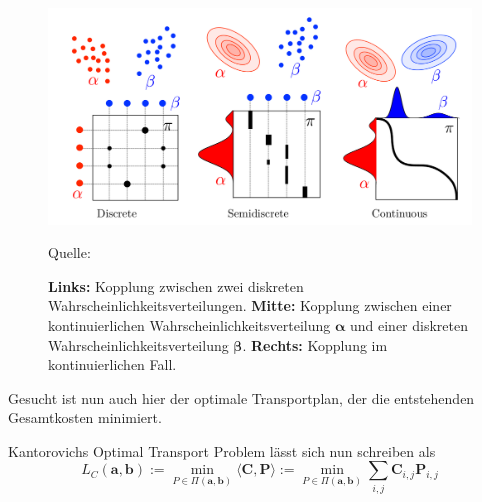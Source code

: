 \documentclass[twoside, 12pt,a4paper]{book}
\newcommand{\source}[1]{\caption*{\hfill Quelle: {#1}} }
\numberwithin{equation}{section}
\begin{document}
	\begin{figure}[ht]
		\centering
		\includegraphics[width=0.4\textheight]{coupling_disc_semid_cont.png}
		\caption[Transportpläne im diskreten, semi-diskreten und kontinuierlichen Fall]{\textbf{Links: }Kopplung zwischen zwei diskreten Wahrscheinlichkeitsverteilungen. \textbf{ Mitte: }Kopplung zwischen einer kontinuierlichen Wahrscheinlichkeitsverteilung $\boldsymbol{\alpha}$ und einer diskreten Wahrscheinlichkeitsverteilung $\boldsymbol{\beta}$. \textbf{Rechts: }Kopplung im kontinuierlichen Fall.}
		\source{\cite{COTcuturi}}
		\label{im:couplings}
	\end{figure}
	
	
	\noindent Gesucht ist nun auch hier der optimale Transportplan, der die entstehenden Gesamtkosten minimiert. 

	Kantorovichs Optimal Transport Problem lässt sich nun schreiben als 
	\begin{equation}
	L_C(\boldsymbol{a}, \boldsymbol{b}) := \min_{P \in \Pi(\boldsymbol{a}, \boldsymbol{b})} \langle \boldsymbol{C}, \boldsymbol{P} \rangle := \min_{P \in \Pi(\boldsymbol{a}, \boldsymbol{b})} \sum_{i,j}{\boldsymbol{C}_{i,j}\boldsymbol{P}_{i,j}} \label{KOTP}
	\end{equation}
	
\end{document}
